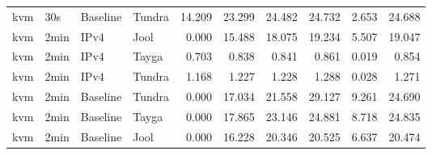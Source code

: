 \begin{table}[htbp]
\begin{tabular}{|l|l|l|l|r|r|r|r|r|r|}
kvm & 30s & Baseline & Tundra & 14.209 & 23.299 & 24.482 & 24.732 & 2.653 & 24.688 \\
kvm & 2min & IPv4 & Jool & 0.000 & 15.488 & 18.075 & 19.234 & 5.507 & 19.047 \\
kvm & 2min & IPv4 & Tayga & 0.703 & 0.838 & 0.841 & 0.861 & 0.019 & 0.854 \\
kvm & 2min & IPv4 & Tundra & 1.168 & 1.227 & 1.228 & 1.288 & 0.028 & 1.271 \\
kvm & 2min & Baseline & Tundra & 0.000 & 17.034 & 21.558 & 29.127 & 9.261 & 24.690 \\
kvm & 2min & Baseline & Tayga & 0.000 & 17.865 & 23.146 & 24.881 & 8.718 & 24.835 \\
kvm & 2min & Baseline & Jool & 0.000 & 16.228 & 20.346 & 20.525 & 6.637 & 20.474 \\
\hline
\end{tabular}
\end{table}


